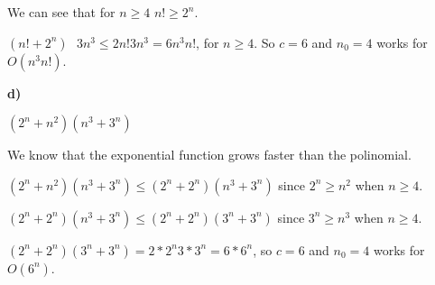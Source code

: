 We can see that for $n\geq{}4$ $n!\geq{}2^n$.

$(n!+2^n)\text{ }3n^3 \leq{} 2n!3n^3 = 6n^3n!$, for $n\geq{}4$. So $c=6$ and $n_0=4$ works for $O(n^3n!)$.

\textbf{d)}

$(2^n+n^2)(n^3+3^n)$

We know that the exponential function grows faster than the polinomial.

$(2^n+n^2)(n^3+3^n) \leq{} (2^n+2^n)(n^3+3^n)$ since $2^n \geq{} n^2$ when $n\geq{}4$.

$(2^n+2^n)(n^3+3^n) \leq{} (2^n+2^n)(3^n+3^n)$ since $3^n \geq{} n^3$ when $n\geq{}4$.

$(2^n+2^n)(3^n+3^n) = 2*2^n3*3^n = 6*6^n$, so $c=6$ and $n_0=4$ works for $O(6^n)$.